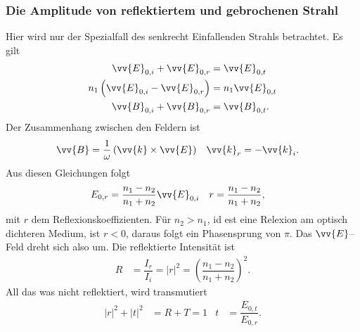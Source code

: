 \documentclass[a4paper,12pt]{article}
\numberwithin{equation}{section}
\begin{document}
\subsubsection{Die Amplitude von reflektiertem und gebrochenen Strahl}
Hier wird nur der Spezialfall des senkrecht Einfallenden Strahls betrachtet. Es gilt
\begin{align} 
        \vv{E}_{0,i}+\vv{E}_{0,r}&=\vv{E}_{0,t}\\
        n_1\left(\vv{E}_{0,i}-\vv{E}_{0,r}\right)&=n_1\vv{E}_{0,t}\\
        \vv{B}_{0,i}+\vv{B}_{0,r}&=\vv{B}_{0,t}
.\end{align} 
Der Zusammenhang zwischen den Feldern ist
\begin{align} 
        \vv{B}&=\dfrac{1}{\omega }\left(\vv{k}\times \vv{E}\right)&\vv{k}_r&=-\vv{k}_i
.\end{align} 
Aus diesen Gleichungen folgt
\begin{align} 
        E_{0,r}&=\dfrac{n_1-n_2}{n_1+n_2}\vv{E}_{0,i}&r&=\dfrac{n_1-n_2}{n_1+n_2}
,\end{align} 
mit $r$ dem Reflexionskoeffizienten. Für $n_2>n_1$, id est eine Relexion am optisch dichteren Medium, ist $r<0$, daraus folgt ein Phasensprung von $\pi $. Das $\vv{E}$--Feld dreht sich also um. Die reflektierte Intensität ist
\begin{align} 
        R&=\dfrac{I_r}{I_i}=|r|^2=\left(\dfrac{n_1-n_2}{n_1+n_2}\right)^2
.\end{align} 
All das was nicht reflektiert, wird transmutiert
\begin{align} 
        |r|^2+|t|^2&=R+T=1&t&=\dfrac{E_{0,t}}{E_{0,r}}
.\end{align} 


\end{document}
